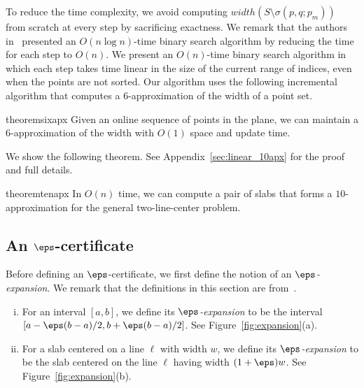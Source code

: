 To reduce the time complexity, we avoid computing ${width}(S \setminus \sigma(p, q; p_m))$ from scratch at every step by sacrificing exactness.  
We remark that the authors in~\cite{agarwalTwo} presented an $O(n \log n)$-time 
binary search algorithm by reducing the time for each step to $O(n)$. 
We present an $O(n)$-time binary search algorithm in which each step 
takes time linear in the size of the current range of indices, even when the points are not sorted.
Our algorithm uses the following incremental algorithm that computes a $6$-approximation of the width of a point set.


\begin{restatable}{theorem}{sixapx}
    \label{thm:6apx}
    Given an online sequence of points in the plane, we can maintain a $6$-approximation of the width with $O(1)$ space and update time.
\end{restatable}



We show the following theorem. See Appendix~\ref{sec:linear_10apx} for the proof and full details.

\begin{restatable}{theorem}{tenapx}
    \label{thm:10apx}
    In $O(n)$ time, we can compute a pair of slabs that forms a $10$-approximation for the general two-line-center problem.
\end{restatable}

\subsection{An \texorpdfstring{$\eps$}{epsilon}-certificate}
\label{sec:eps_certificate}


Before defining an $\eps$-certificate, we first define the notion of an \emph{$\eps$-expansion}.
We remark that the definitions in this section are from~\cite{agarwal2005approximation}.

\begin{definition}
\begin{enumerate}[(i)]
    \item For an interval $[a, b]$, 
    we define its \emph{$\eps$-expansion} to be the interval $[a- \eps(b-a)/2, b + \eps(b-a)/2]$. See Figure~\ref{fig:expansion}(a).
    \item For a slab centered on a line $\ell$ with width $w$,
    we define its \emph{$\eps$-expansion} to be the slab centered on the line $\ell$ having width  $(1+ \eps) w$.
    See Figure~\ref{fig:expansion}(b).
\end{enumerate}
\end{definition}


